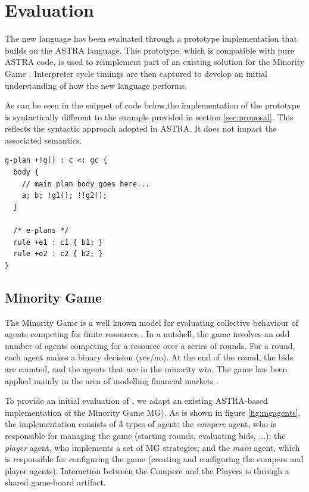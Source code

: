\section{Evaluation}
\label{sec:evaluation}
The new language has been evaluated through a prototype implementation that builds on 
the ASTRA \cite{DBLP:conf/prima/CollierRL15} language. This prototype, which is compatible
with pure ASTRA code, is used to reimplement part of an existing solution for the Minority 
Game \cite{moro2004minority}. Interpreter cycle timings are then captured to develop an initial
understanding of how the new language performs.

As can be seen in the  snippet of code below,the implementation of the {\aser} prototype is 
syntactically different to the example provided in section \ref{sec:proposal}. This reflects 
the syntactic approach adopted in ASTRA. It does not impact the associated semantics.

{\small
\begin{verbatim}
g-plan +!g() : c <: gc { 
  body {
    // main plan body goes here...
    a; b; !g1(); !!g2();
  }

  /* e-plans */
  rule +e1 : c1 { b1; }
  rule +e2 : c2 { b2; }
}
\end{verbatim}}

\subsection{Minority Game}
\label{minority}
The Minority Game is a well known model for evaluating collective behaviour of agents competing 
for finite resources \cite{moro2004minority}. In a nutshell, the game involves an odd number of
agents competing for a resource over a series of rounds. For a round, each agent makes a binary
decision (yes/no). At the end of the round, the bids are counted, and the agents that are in the
minority win. The game has been applied mainly in the area of modelling financial markets \cite{??}.

To provide an initial evaluation of {\aser}, we adapt an existing ASTRA-based implementation of 
the Minority Game MG). As is shown in figure \ref{fig:mgagents}, the implementation consists of
3 types of agent: the \emph{compere} agent, who is responsible for managing the game (starting 
rounds, evaluating bids, ...); the \emph{player} agent, who implements a set of MG strategies; 
and the \emph{main} agent, which is responsible for configuring the game (creating and configuring
the compere and player agents). Interaction between the Compere and the Players is through a shared 
game-board artifact.

